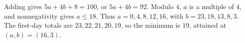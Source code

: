 Adding gives $5a+4b+8=100$, or $5a+4b=92$. Modulo $4$, $a$ is a multiple of $4$, and nonnegativity gives $a\le18$. Thus $a=0,4,8,12,16$, with $b=23,18,13,8,3$. The first-day totals are $23,22,21,20,19$, so the minimum is $\boxed{19}$, attained at $(a,b)=(16,3)$.
